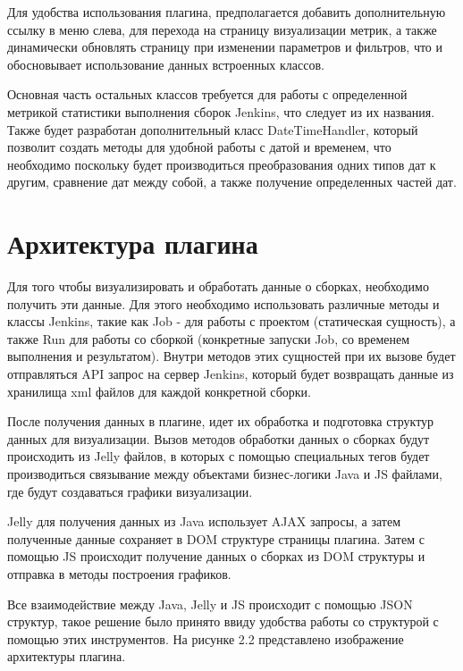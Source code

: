 Для удобства использования плагина, предполагается добавить дополнительную ссылку в меню слева, для перехода на страницу визуализации метрик, а также динамически обновлять страницу при изменении параметров и фильтров, что и обосновывает использование данных встроенных классов.

Основная часть остальных классов требуется для работы с определенной метрикой статистики выполнения сборок Jenkins, что следует из их названия. Также будет разработан дополнительный класс DateTimeHandler, который позволит создать методы для удобной работы с датой и временем, что необходимо поскольку будет производиться преобразования одних типов дат к другим, сравнение дат между собой, а также получение определенных частей дат.

\section{Архитектура плагина} \label{ch1:sec3}

Для того чтобы визуализировать и обработать данные о сборках, необходимо получить эти данные. Для этого необходимо использовать различные методы и классы Jenkins, такие как Job - для работы с проектом (статическая сущность), а также Run для работы со сборкой (конкретные запуски Job, со временем выполнения и результатом). Внутри методов этих сущностей при их вызове будет отправляться API запрос на сервер Jenkins, который будет возвращать данные из хранилища xml файлов для каждой конкретной сборки.

После получения данных в плагине, идет их обработка и подготовка структур данных для визуализации. Вызов методов обработки данных о сборках будут происходить из Jelly файлов, в которых с помощью специальных тегов будет производиться связывание между объектами бизнес-логики Java и JS файлами, где будут создаваться графики визуализации.

Jelly для получения данных из Java использует AJAX запросы, а затем полученные данные сохраняет в DOM структуре страницы плагина. Затем с помощью JS происходит получение данных о сборках из DOM структуры и отправка в методы построения графиков.

Все взаимодействие между Java, Jelly и JS происходит с помощью JSON структур, такое решение было принято ввиду удобства работы со структурой с помощью этих инструментов. На рисунке 2.2 представлено изображение архитектуры плагина.

